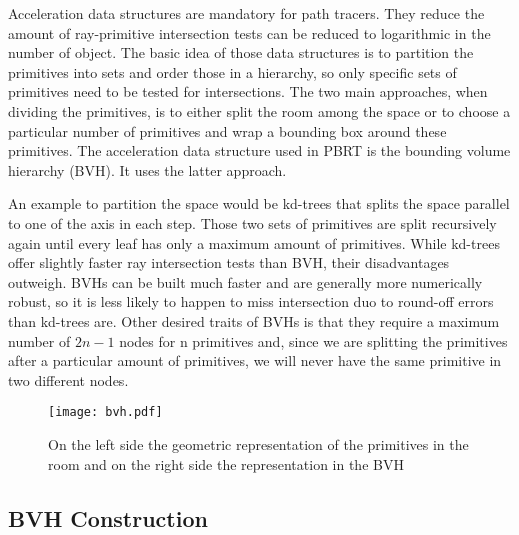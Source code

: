 Acceleration data structures are mandatory for path tracers. They reduce the amount of ray-primitive intersection tests can be reduced to logarithmic in the number of object. The basic idea of those data structures is to partition the primitives into sets and order those in a hierarchy, so only specific sets of primitives need to be tested for intersections. The two main approaches, when dividing the primitives, is to either split the room among the space or to choose a particular number of primitives and wrap a bounding box around these primitives. The acceleration data structure used in PBRT is the bounding volume hierarchy (BVH). It uses the latter approach.

An example to partition the space would be kd-trees that splits the space parallel to one of the axis in each step. Those two sets of primitives are split recursively again until every leaf has only a maximum amount of primitives.  While kd-trees offer slightly faster ray intersection tests than BVH, their disadvantages outweigh. BVHs can be built much faster and are generally more numerically robust, so it is less likely to happen to miss intersection duo to round-off errors than kd-trees are. Other desired traits of BVHs is that they require a maximum number of $2n - 1$ nodes for n primitives and, since we are splitting the primitives after a particular amount of primitives, we will never have the same primitive in two different nodes.

\begin{figure}
	\begin{center}
		\texttt{[image: bvh.pdf]}
		\caption{On the left side the geometric representation of the primitives in the room and on the right side the representation in the BVH}
		\label{fig:bvh}
	\end{center}
\end{figure}


\subsection{BVH Construction}

